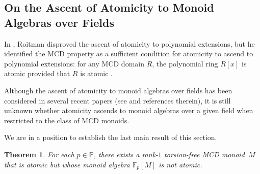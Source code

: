 \documentclass[10pt]{amsart}
\newtheorem{theorem}{Theorem}[section]
\theoremstyle{definition}
\theoremstyle{remark}
\numberwithin{equation}{section}
\newcommand{\ff}{\mathbb{F}}
\newcommand{\pp}{\mathbb{P}}
\begin{document}
\smallskip
\subsection{On the Ascent of Atomicity to Monoid Algebras over Fields}

In \cite{mR93}, Roitman disproved the ascent of atomicity to polynomial extensions, but he identified the MCD property as a sufficient condition for atomicity to ascend to polynomial extensions: for any MCD domain $R$, the polynomial ring $R[x]$ is atomic provided that $R$ is atomic \cite[Proposition~1.1]{mR93}. 

Although the ascent of atomicity to monoid algebras over fields has been considered in several recent papers (see \cite{GR25} and references therein), it is still unknown whether atomicity ascends to monoid algebras over a given field when restricted to the class of MCD monoids. 

We are in a position to establish the last main result of this section.

\begin{theorem}
  For each $p \in \pp$, there exists a rank-$1$ torsion-free MCD monoid~$M$ that is atomic but whose monoid algebra $\ff_p[M]$ is not atomic.
\end{theorem}
\end{document}
